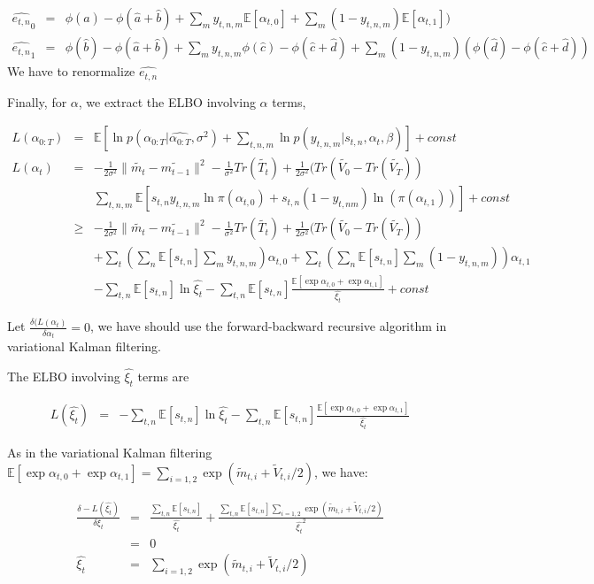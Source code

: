 \documentclass[11pt]{report}
\newcommand{\Ep}{\mathbb{E}}
\begin{document}
\begin{eqnarray}
\hat{e_{t,n}}_0 & = &\phi(\hat{a})-\phi(\hat{a}+\hat{b}) + \sum_{m}  y_{t,n,m}   \Ep[\alpha_{t,0}] +\sum_m (1-y_{t,n,m}) \Ep[\alpha_{t,1}])   \\\nonumber
\hat{e_{t,n}}_1 & = &\phi(\hat{b})-\phi(\hat{a}+\hat{b}) + \sum_{m}  y_{t,n,m} \phi(\hat{c})-\phi(\hat{c}+\hat{d}) +\sum_m (1-y_{t,n,m}) (\phi(\hat{d})-\phi(\hat{c}+\hat{d})) 
\end{eqnarray}
We have to renormalize $\hat{e_{t,n}}$

Finally, for $\alpha$, we extract the ELBO involving $\alpha$ terms, 

\begin{eqnarray*}
L(\alpha_{0:T}) & = & \Ep[\ln p(\alpha_{0:T}|\hat{\alpha_{0:T}},\sigma^2) + \sum_{t,n,m}  \ln p(y_{t,n,m}|s_{t,n},\alpha_t,\beta) ] + const \\\nonumber
L(\alpha_t) & = & -\frac{1}{2\sigma^2} \|\tilde{m_t}-\tilde{m_{t-1}}\|^2 - \frac{1}{\sigma^2} Tr(\tilde {T_t}) + \frac{1}{2\sigma^2} (Tr(\tilde{V_0} - Tr(\tilde{V_T})) \\\nonumber
& & \sum_{t,n,m} \Ep [s_{t,n} y_{t,n,m} \ln \pi(\alpha_{t,0}) + s_{t,n}(1-y_{t,nm}) \ln (\pi(\alpha_{t,1}))] + const \\\nonumber
& \geq & -\frac{1}{2\sigma^2} \|\tilde{m_t}-\tilde{m_{t-1}}\|^2 - \frac{1}{\sigma^2} Tr(\tilde {T_t}) + \frac{1}{2\sigma^2} (Tr(\tilde{V_0} - Tr(\tilde{V_T})) \\\nonumber
& & + \sum_t(\sum_n \Ep[s_{t,n}] \sum_m y_{t,n,m}) \alpha_{t,0} + \sum_t(\sum_n \Ep[s_{t,n}] \sum_m (1-y_{t,n,m})) \alpha_{t,1}\\\nonumber
& & - \sum_{t,n} \Ep[s_{t,n}] \ln \hat{\xi_t}  -  \sum_{t,n} \Ep[s_{t,n}] \frac{\Ep[\exp \alpha_{t,0} + \exp \alpha_{t,1} ]}{\hat{\xi_t}}  + const
\end{eqnarray*}

Let $\frac{\delta(L(\alpha_t)}{\delta \alpha_t}=0$, we have should use the forward-backward recursive algorithm in variational Kalman filtering. 

The ELBO involving $\hat{\xi_t}$ terms are 

\begin{eqnarray*}
L(\hat{\xi_t}) & = & - \sum_{t,n} \Ep[s_{t,n}] \ln \hat{\xi_t}  -  \sum_{t,n} \Ep[s_{t,n}] \frac{\Ep[\exp \alpha_{t,0} + \exp \alpha_{t,1} ]}{\hat{\xi_t}} 
\end{eqnarray*}

As in the variational Kalman filtering $\Ep[\exp \alpha_{t,0} + \exp \alpha_{t,1}]=\sum_{i=1,2} \exp (\tilde{m}_{t,i}+\tilde{V}_{t,i}/2)$, we have:

\begin{eqnarray}
\frac{\delta -L(\hat{\xi_t}) }{\delta \xi_t} & = & \frac{\sum_{t,n} \Ep[s_{t,n}] }{ \hat{\xi_t}  } + \frac{ \sum_{t,n} \Ep[s_{t,n}]  \sum_{i=1,2} \exp (\tilde{m}_{t,i}+\tilde{V}_{t,i}/2)}{\hat{\xi_t} ^2}\\\nonumber
& = & 0\\\nonumber
\hat{\xi_t} & = &  \sum_{i=1,2} \exp (\tilde{m}_{t,i}+\tilde{V}_{t,i}/2)
 \end{eqnarray}
\end{document}
